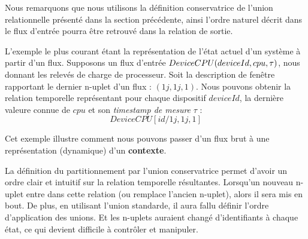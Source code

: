 Nous remarquons que nous utilisons la définition conservatrice de l'union relationnelle présenté dans la section précédente, ainsi l'ordre naturel décrit dans le flux d'entrée pourra être retrouvé dans la relation de sortie.
\begin{example}
	L'exemple le plus courant étant la représentation de l'état actuel d'un système à partir d'un flux. Supposons un flux d'entrée $DeviceCPU(deviceId,cpu,\tau)$, nous donnant les relevés de charge de processeur. Soit la description de fenêtre rapportant le dernier n-uplet d'un flux : $(1j,1j,1)$. Nous pouvons obtenir la relation temporelle représentant pour chaque dispositif $deviceId$, la dernière valeure connue de $cpu$ et son \textit{timestamp de mesure} $\tau$ : $$DeviceCPU[id/1j,1j,1]$$

	Cet exemple illustre comment nous pouvons passer d'un flux brut à une représentation (dynamique) d'un \textbf{contexte}. 
	
	La définition du partitionnement par l'union conservatrice permet d'avoir un ordre clair et intuitif sur la relation temporelle résultantes. Lorsqu'un nouveau n-uplet entre dans cette relation (ou remplace l'ancien n-uplet), alors il sera mis en bout. De plus, en utilisant l'union standarde, il aura fallu définir l'ordre d'application des unions. Et les n-uplets auraient changé d'identifiants à chaque état, ce qui devient difficile à contrôler et manipuler.
\end{example}


